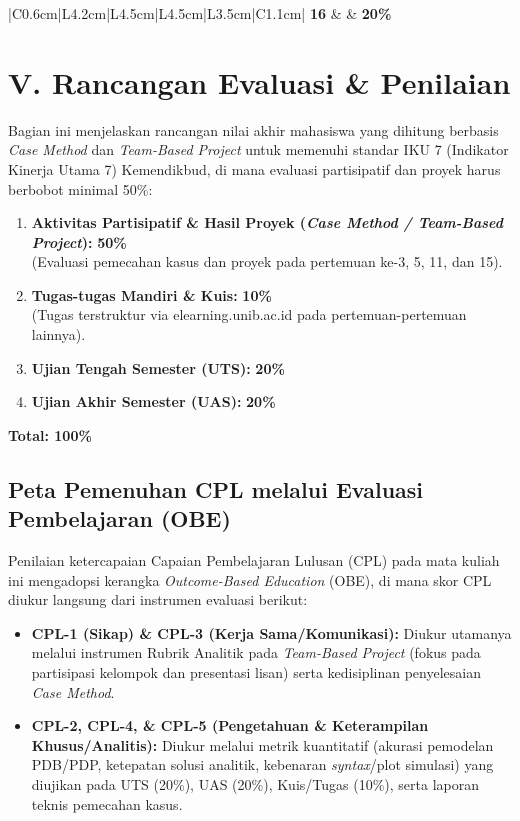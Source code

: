 \documentclass[11pt,a4paper]{article}
\begin{document}
\begin{longtable}{|C{0.6cm}|L{4.2cm}|L{4.5cm}|L{4.5cm}|L{3.5cm}|C{1.1cm}|}
 \textbf{16} &  & \textbf{20\%} \\ \hline

\end{longtable}

\newpage
\section*{V. Rancangan Evaluasi \& Penilaian}
Bagian ini menjelaskan rancangan nilai akhir mahasiswa yang dihitung berbasis \textit{Case Method} dan \textit{Team-Based Project} untuk memenuhi standar IKU 7 (Indikator Kinerja Utama 7) Kemendikbud, di mana evaluasi partisipatif dan proyek harus berbobot minimal 50\%:

\begin{enumerate}[label=\textbf{\arabic*.}, leftmargin=*]
    \item \textbf{Aktivitas Partisipatif \& Hasil Proyek (\textit{Case Method / Team-Based Project}):} \textbf{50\%} 
    \\(Evaluasi pemecahan kasus dan proyek pada pertemuan ke-3, 5, 11, dan 15).
    \item \textbf{Tugas-tugas Mandiri \& Kuis:} \textbf{10\%} 
    \\(Tugas terstruktur via elearning.unib.ac.id pada pertemuan-pertemuan lainnya).
    \item \textbf{Ujian Tengah Semester (UTS):} \textbf{20\%} 
    \item \textbf{Ujian Akhir Semester (UAS):} \textbf{20\%} 
\end{enumerate}

\noindent\textbf{Total: 100\%}

\vspace{0.3cm}
\subsection*{Peta Pemenuhan CPL melalui Evaluasi Pembelajaran (OBE)}
Penilaian ketercapaian Capaian Pembelajaran Lulusan (CPL) pada mata kuliah ini mengadopsi kerangka \textit{Outcome-Based Education} (OBE), di mana skor CPL diukur langsung dari instrumen evaluasi berikut:
\begin{itemize}[leftmargin=*, label=$\bullet$, noitemsep]
    \item \textbf{CPL-1 (Sikap) \& CPL-3 (Kerja Sama/Komunikasi):} Diukur utamanya melalui instrumen Rubrik Analitik pada \textit{Team-Based Project} (fokus pada partisipasi kelompok dan presentasi lisan) serta kedisiplinan penyelesaian \textit{Case Method}.
    \item \textbf{CPL-2, CPL-4, \& CPL-5 (Pengetahuan \& Keterampilan Khusus/Analitis):} Diukur melalui metrik kuantitatif (akurasi pemodelan PDB/PDP, ketepatan solusi analitik, kebenaran \textit{syntax}/plot simulasi) yang diujikan pada UTS (20\%), UAS (20\%), Kuis/Tugas (10\%), serta laporan teknis pemecahan kasus.
\end{itemize}
\end{document}

